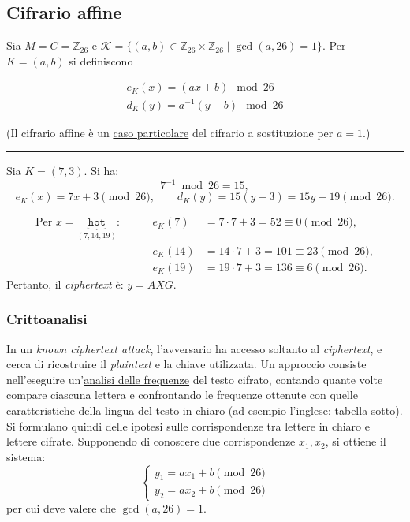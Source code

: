     
    \subsection{Cifrario affine}
            Sia $M = C = \mathbb{Z}_{26}$ e $\mathcal{K} = \{ (a,b) \in \mathbb{Z}_{26} \times \mathbb{Z}_{26} \mid \gcd(a,26) = 1 \}$.            
            Per $K = (a,b)$ si definiscono
            
            \begin{align*}
                e_K(x) = (ax + b) \mod 26\\
                d_K(y) = a^{-1}(y-b) \mod 26
            \end{align*}

        \noindent(Il cifrario affine è un \underline{caso particolare} del cifrario a sostituzione per $a=1$.)

        \vspace{1em}
        \hrule

        \begin{example}
        Sia $K=(7,3)$. Si ha:
        \[
        7^{-1}\bmod 26=15,
        \]
        \[
        e_K(x)=7x+3\pmod{26},\qquad
        d_K(y)=15(y-3)=15y-19\pmod{26}.
        \]

        \[
        \begin{aligned}
        \text{Per } x=\underbrace{\texttt{hot}}_{(7,14,19)}:
        &\qquad e_K(7)  &= 7\cdot 7+3 = 52 \equiv 0 \pmod{26},\\
        &\qquad e_K(14) &= 14\cdot 7+3 = 101 \equiv 23 \pmod{26},\\
        &\qquad e_K(19) &= 19\cdot 7+3 = 136 \equiv 6 \pmod{26}.
        \end{aligned}
        \]
        Pertanto, il \textit{ciphertext} è: $y=AXG$.
        \end{example}


\subsubsection{Crittoanalisi}
In un \textit{known ciphertext attack}, l'avversario ha accesso soltanto al \textit{ciphertext}, e cerca di ricostruire il \textit{plaintext} e la chiave utilizzata. Un approccio consiste nell'eseguire un'\underline{analisi delle frequenze} del testo cifrato, contando quante volte compare ciascuna lettera e confrontando le frequenze ottenute con quelle caratteristiche della lingua del testo in chiaro (ad esempio l'inglese: tabella sotto). \\ Si formulano quindi delle ipotesi sulle corrispondenze tra lettere in chiaro e lettere cifrate. Supponendo di conoscere due
corrispondenze $x_1, x_2$, si ottiene il sistema:
\[
\begin{cases}
y_1 = ax_1+b \pmod{26}\\
y_2 = ax_2+b \pmod{26}
\end{cases}
\]
per cui deve valere che $\gcd(a,26)=1$.

